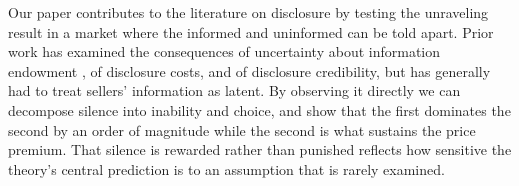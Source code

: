 Our paper contributes to the literature on disclosure by testing the unraveling result in a
market where the informed and uninformed can be told apart. Prior work has examined the
consequences of uncertainty about information endowment \citep{dye_disclosure_1985,
jung_kwon_1988}, of disclosure costs, and of disclosure credibility, but has generally had to
treat sellers' information as latent. By observing it directly we can decompose silence into
inability and choice, and show that the first dominates the second by an order of magnitude
while the second is what sustains the price premium. That silence is rewarded rather
than punished reflects how sensitive the theory's central prediction is to an assumption that
is rarely examined.
